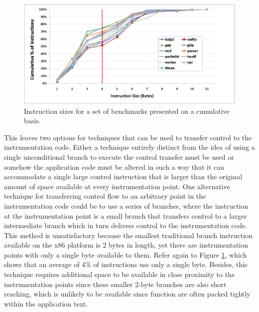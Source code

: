 \begin{figure}[ht]
\centering
\label{fig:InstructionSizes}
\includegraphics[scale=0.4]{instsize.eps}
\caption{Instruction sizes for a set of benchmarks presented on a cumulative basis.}
\end{figure}

This leaves two options for techniques that can be used to transfer control to the instrumentation code.
Either a technique entirely distinct from the idea of using a single
unconditional branch to execute the control transfer must be used or somehow the application code must be altered
in such a way that it can accommodate a single large control instruction that is larger than
the original amount of space available at every instrumentation point. One alternative
technique for transferring control flow to an arbitrary point in the instrumentation code could be to use a series of branches,
where the instruction at the instrumentation point is a small branch that
transfers control to a larger intermediate branch which in turn delivers control to the instrumentation code. This
method is unsatisfactory because the smallest traditional branch instruction available
on the x86 platform is 2 bytes in length, yet there are
instrumentation points with only a single byte available to them. Refer again to Figure \ref{fig:InstructionSizes}, which shows
that an average of 4\% of instructions use only a single byte.
Besides, this technique requires additional space to be available in close proximity to the instrumentation points since these
smaller 2-byte branches are also short reaching, which is unlikely to be available since function are often
packed tightly within the application text.

